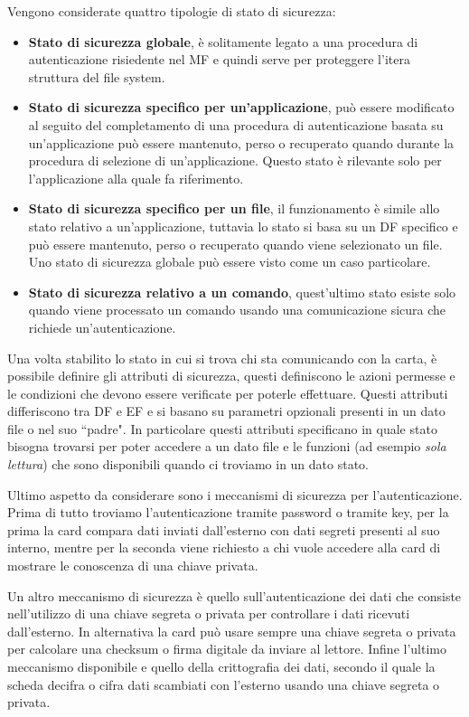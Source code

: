 Vengono considerate quattro tipologie di stato di sicurezza:
\begin{itemize}
    \item \textbf{Stato di sicurezza globale}, è solitamente legato a una procedura di autenticazione risiedente nel MF e quindi serve per proteggere l'itera struttura del file system.
    \item \textbf{Stato di sicurezza specifico per un'applicazione}, può essere modificato al seguito del completamento di una procedura di autenticazione basata su un'applicazione può essere mantenuto, perso o recuperato quando durante la procedura di selezione di un'applicazione. Questo stato è rilevante solo per l'applicazione alla quale fa riferimento.
    \item \textbf{Stato di sicurezza specifico per un file}, il funzionamento è simile allo stato relativo a un'applicazione, tuttavia lo stato si basa su un DF specifico e può essere mantenuto, perso o recuperato quando viene selezionato un file. Uno stato di sicurezza globale può essere visto come un caso particolare.
    \item \textbf{Stato di sicurezza relativo a un comando}, quest'ultimo stato esiste solo quando viene processato un comando usando una comunicazione sicura che richiede un'autenticazione.
\end{itemize}

Una volta stabilito lo stato in cui si trova chi sta comunicando con la carta, è possibile definire gli attributi di sicurezza, questi definiscono le azioni permesse e le condizioni che devono essere verificate per poterle effettuare. Questi attributi differiscono tra DF e EF e si basano su parametri opzionali presenti in un dato file o nel suo ``padre". In particolare questi attributi specificano in quale stato bisogna trovarsi per poter accedere a un dato file e le funzioni (ad esempio \textit{sola lettura}) che sono disponibili quando ci troviamo in un dato stato.

Ultimo aspetto da considerare sono i meccanismi di sicurezza per l'autenticazione. Prima di tutto troviamo l'autenticazione tramite password o tramite key, per la prima la card compara dati inviati dall'esterno con dati segreti presenti al suo interno, mentre per la seconda viene richiesto a chi vuole accedere alla card di mostrare le conoscenza di una chiave privata.

Un altro meccanismo di sicurezza è quello sull'autenticazione dei dati che consiste nell'utilizzo di una chiave segreta o privata per controllare i dati ricevuti dall'esterno. In alternativa la card può usare sempre una chiave segreta o privata per calcolare una checksum o firma digitale da inviare al lettore. Infine l'ultimo meccanismo disponibile e quello della crittografia dei dati, secondo il quale la scheda decifra o cifra dati scambiati con l'esterno usando una chiave segreta o privata.

